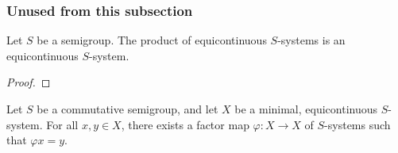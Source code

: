 \subsubsection{Unused from this subsection}

\begin{lemma}
    \label{lemma_product_of_equi_is_equi}
    \leanok{}
    Let $S$ be a semigroup.  The product of equicontinuous $S$-systems is an equicontinuous $S$-system.
\end{lemma}

\begin{proof}
\leanok{}
    
\end{proof}

\begin{lemma}
    \label{lemma_minimal_equi_implies_homogeneous}
    Let $S$ be a commutative semigroup, and let $X$ be a minimal, equicontinuous $S$-system.  For all $x, y \in X$, there exists a factor map $\varphi: X \to X$ of $S$-systems such that $\varphi x = y$.
\end{lemma}


